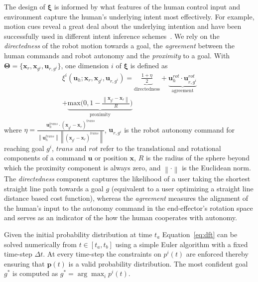 \documentclass[natbib, twocolumn]{svjour3}          %
\newcommand{\argmax}{\arg\!\max}
\newcommand{\norm}[1]{\left\lVert#1\right\rVert}
\begin{document}
The design of $\boldsymbol{\xi}$ is informed by what features of the human control input and environment capture the human's underlying intent most effectively. For example, motion cues reveal a great deal about the underlying intention and have been successfully used in different intent inference schemes~\citep{barrett2005accurate}. We rely on the \textit{directedness} of the robot motion towards a goal, the \textit{agreement} between the human commands and robot autonomy and the \textit{proximity} to a goal. 
With $\boldsymbol{\Theta} = \{\boldsymbol{x}_r, \boldsymbol{x}_{g^i}, \boldsymbol{u}_{r, g^i}\}$, one dimension $i$ of $\boldsymbol{\xi}$ is defined as 
\begin{multline*}
\xi^i(\boldsymbol{u}_h;\boldsymbol{x}_r, \boldsymbol{x}_{g^i}, \boldsymbol{u}_{r, g^i}) = \underbrace{\frac{1 + \eta}{2}}_{\text{directedness}} + \underbrace{\boldsymbol{u}_{h}^{rot}\cdot\boldsymbol{u}_{r,g^i}^{rot}}_{\text{agreement}}
\\+ \underbrace{\text{max}\Big(0, 1-\frac{\norm{\boldsymbol{x}_{g^i} - \boldsymbol{x}_r}}{R}\Big)}_{\text{proximity}}
\end{multline*}
where  $\eta = \frac{\boldsymbol{u}_h^{trans}\cdot(\boldsymbol{x}_{g^i} - \boldsymbol{x}_r)^{trans}}{\norm{\boldsymbol{u}_h^{trans}}\norm{(\boldsymbol{x}_{g^i} - \boldsymbol{x}_r)^{trans}}}$, $\boldsymbol{u}_{r,g^i}$ is the robot autonomy command for reaching goal $g^i$, $trans$ and $rot$ refer to the translational and rotational components of a command $\boldsymbol{u}$ or position $\boldsymbol{x}$,  $R$ is the radius of the sphere beyond which the proximity component is always zero, and $\norm{\cdot}$ is the Euclidean norm. The \textit{directedness} component captures the likelihood of a user taking the shortest straight line path towards a goal $g$ (equivalent to a user optimizing a straight line distance based cost function), whereas the \textit{agreement} measures the alignment of the human's input to the autonomy command in the end-effector's rotation space and serves as an indicator of the how the human cooperates with autonomy.

Given the initial probability distribution at time $t_a$ Equation~\ref{eq:dft} can be solved numerically from $t \in [t_a, t_b]$ using a simple Euler algorithm with a fixed time-step $\Delta t$. At every time-step the constraints on $p^i(t)$ are enforced thereby ensuring that $\boldsymbol{p}(t)$ is a valid probability distribution. 
The most confident goal $g^*$ is computed as $g^* = \argmax_i  p^i(t)$.
\end{document}

